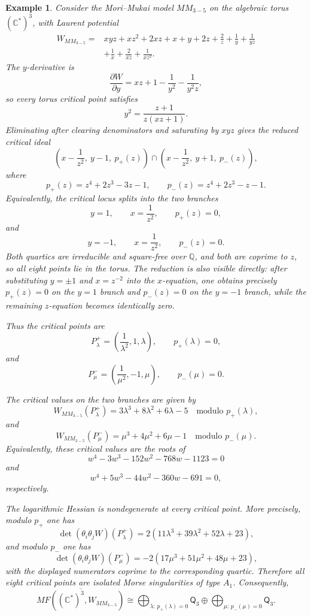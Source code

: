 \documentclass[11pt]{amsart}
\newtheorem{example}{Example}[section]
\newcommand{\MorseCat}[1]{\mathsf{Q}_{#1}}
\begin{document}
\begin{example}
Consider the Mori--Mukai model $MM_{3-5}$ on the algebraic torus
$(\mathbb{C}^*)^3$, with Laurent potential
\begin{align*}
W_{MM_{3-5}}={}&xyz+xz^2+2xz+x+y+2z+\frac{2}{z}
+\frac{1}{y}+\frac{1}{yz} \\
&+\frac{1}{x}+\frac{2}{xz}+\frac{1}{xz^2}.
\end{align*}
The $y$-derivative is
\[
\frac{\partial W}{\partial y}
=xz+1-\frac{1}{y^2}-\frac{1}{y^2z},
\]
so every torus critical point satisfies
\[
y^2=\frac{z+1}{z(xz+1)}.
\]
Eliminating after clearing denominators and saturating by $xyz$ gives the
reduced critical ideal
\[
\left(
x-\frac{1}{z^2},\ y-1,\ p_+(z)
\right)
\cap
\left(
x-\frac{1}{z^2},\ y+1,\ p_-(z)
\right),
\]
where
\[
p_+(z)=z^4+2z^3-3z-1,
\qquad
p_-(z)=z^4+2z^3-z-1.
\]
Equivalently, the critical locus splits into the two branches
\[
y=1,
\qquad
x=\frac{1}{z^2},
\qquad
p_+(z)=0,
\]
and
\[
y=-1,
\qquad
x=\frac{1}{z^2},
\qquad
p_-(z)=0.
\]
Both quartics are irreducible and square-free over $\mathbb{Q}$, and both are
coprime to $z$, so all eight points lie in the torus. The reduction is also
visible directly: after substituting $y=\pm1$ and $x=z^{-2}$ into the
$x$-equation, one obtains precisely $p_+(z)=0$ on the $y=1$ branch and
$p_-(z)=0$ on the $y=-1$ branch, while the remaining $z$-equation becomes
identically zero.

Thus the critical points are
\[
P^+_\lambda=\left(\frac{1}{\lambda^2},1,\lambda\right),
\qquad
p_+(\lambda)=0,
\]
and
\[
P^-_\mu=\left(\frac{1}{\mu^2},-1,\mu\right),
\qquad
p_-(\mu)=0.
\]

The critical values on the two branches are given by
\[
W_{MM_{3-5}}(P^+_\lambda)=3\lambda^3+8\lambda^2+6\lambda-5
\quad\text{modulo }p_+(\lambda),
\]
and
\[
W_{MM_{3-5}}(P^-_\mu)=\mu^3+4\mu^2+6\mu-1
\quad\text{modulo }p_-(\mu).
\]
Equivalently, these critical values are the roots of
\[
w^4-3w^3-152w^2-768w-1123=0
\]
and
\[
w^4+5w^3-44w^2-360w-691=0,
\]
respectively.

The logarithmic Hessian is nondegenerate at every critical point. More
precisely, modulo $p_+$ one has
\[
\det(\theta_i\theta_jW)(P^+_\lambda)
=2(11\lambda^3+39\lambda^2+52\lambda+23),
\]
and modulo $p_-$ one has
\[
\det(\theta_i\theta_jW)(P^-_\mu)
=-2(17\mu^3+51\mu^2+48\mu+23),
\]
with the displayed numerators coprime to the corresponding quartic. Therefore
all eight critical points are isolated Morse singularities of type $A_1$.
Consequently,
\[
\overline{MF((\mathbb{C}^*)^3,W_{MM_{3-5}})}
\cong \bigoplus_{\lambda:\,p_+(\lambda)=0}\MorseCat{3} \oplus \bigoplus_{\mu:\,p_-(\mu)=0}\MorseCat{3}.
\]
\end{example}
\end{document}
